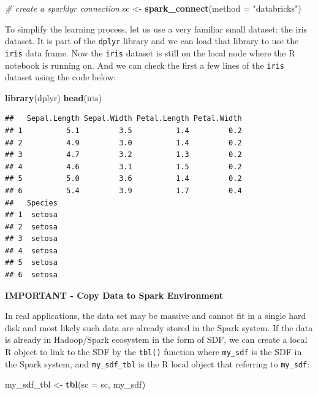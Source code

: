 \documentclass[12pt,]{krantz}
\makeatletter
\newenvironment{Shaded}{\begin{snugshade}}{\end{snugshade}}
\newcommand{\CommentTok}[1]{\textcolor[rgb]{0.37,0.37,0.37}{\textit{#1}}}
\newcommand{\DataTypeTok}[1]{\textcolor[rgb]{0.27,0.27,0.27}{#1}}
\newcommand{\KeywordTok}[1]{\textcolor[rgb]{0.27,0.27,0.27}{\textbf{#1}}}
\newcommand{\NormalTok}[1]{#1}
\newcommand{\StringTok}[1]{\textcolor[rgb]{0.5,0.5,0.5}{#1}}
\newenvironment{kframe}{%
\medskip{}
\setlength{\fboxsep}{.8em}
 \def\at@end@of@kframe{}%
 \ifinner\ifhmode%
  \def\at@end@of@kframe{\end{minipage}}%
  \begin{minipage}{\columnwidth}%
 \fi\fi%
 \def\FrameCommand##1{\hskip\@totalleftmargin \hskip-\fboxsep
 \colorbox{shadecolor}{##1}\hskip-\fboxsep
     \hskip-\linewidth \hskip-\@totalleftmargin \hskip\columnwidth}%
 \MakeFramed {\advance\hsize-\width
   \@totalleftmargin\z@ \linewidth\hsize
   \@setminipage}}%
 {\par\unskip\endMakeFramed%
 \at@end@of@kframe}
\renewenvironment{Shaded}{\begin{kframe}}{\end{kframe}}
\makeatother
\begin{document}
\begin{Shaded}
\begin{Highlighting}[]
\CommentTok{# create a sparklyr connection}
\NormalTok{sc <-}\StringTok{ }\KeywordTok{spark_connect}\NormalTok{(}\DataTypeTok{method =} \StringTok{"databricks"}\NormalTok{)}
\end{Highlighting}
\end{Shaded}

To simplify the learning process, let us use a very familiar small dataset: the iris dataset. It is part of the \texttt{dplyr} library and we can load that library to use the \texttt{iris} data frame. Now the \texttt{iris} dataset is still on the local node where the R notebook is running on. And we can check the first a few lines of the \texttt{iris} dataset using the code below:

\begin{Shaded}
\begin{Highlighting}[]
\KeywordTok{library}\NormalTok{(dplyr)}
\KeywordTok{head}\NormalTok{(iris)}
\end{Highlighting}
\end{Shaded}

\begin{verbatim}
##   Sepal.Length Sepal.Width Petal.Length Petal.Width
## 1          5.1         3.5          1.4         0.2
## 2          4.9         3.0          1.4         0.2
## 3          4.7         3.2          1.3         0.2
## 4          4.6         3.1          1.5         0.2
## 5          5.0         3.6          1.4         0.2
## 6          5.4         3.9          1.7         0.4
##   Species
## 1  setosa
## 2  setosa
## 3  setosa
## 4  setosa
## 5  setosa
## 6  setosa
\end{verbatim}

\textbf{IMPORTANT - Copy Data to Spark Environment}

In real applications, the data set may be massive and cannot fit in a single hard disk and most likely such data are already stored in the Spark system. If the data is already in Hadoop/Spark ecosystem in the form of SDF, we can create a local R object to link to the SDF by the \texttt{tbl()} function where \texttt{my\_sdf} is the SDF in the Spark system, and \texttt{my\_sdf\_tbl} is the R local object that referring to \texttt{my\_sdf}:

\begin{Shaded}
\begin{Highlighting}[]
\NormalTok{my_sdf_tbl <-}\StringTok{ }\KeywordTok{tbl}\NormalTok{(}\DataTypeTok{sc =}\NormalTok{ sc, my_sdf)}
\end{Highlighting}
\end{Shaded}
\end{document}
